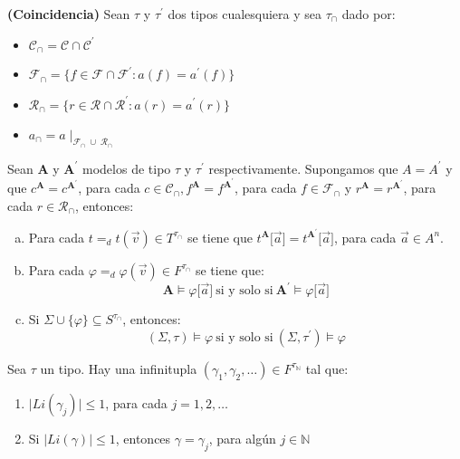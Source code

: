   \begin{lemma} \label{lemma_80}
    \PN \textbf{(Coincidencia)} Sean $\tau$ y $\tau^{\prime}$ dos tipos cualesquiera y sea $\tau_{\cap}$ dado por:
    \begin{itemize}
      \item $\mathcal{C}_{\cap} = \mathcal{C} \cap \mathcal{C}^{\prime}$
      \item $\mathcal{F}_{\cap} = \{f \in \mathcal{F} \cap \mathcal{F}^{\prime}: a(f) = a^{\prime}(f)\}$
      \item $\mathcal{R}_{\cap} = \{r \in \mathcal{R} \cap \mathcal{R}^{\prime}: a(r) = a^{\prime}(r)\}$
      \item $a_{\cap} = a\mid_{\mathcal{F}_{\cap} \; \cup \; \mathcal{R}_{\cap}}$
    \end{itemize}

    \PN Sean $\mathbf{A}$ y $\mathbf{A}^{\prime}$ modelos de tipo $\tau$ y $\tau^{\prime}$ respectivamente. Supongamos
    que $A = A^{\prime}$ y que $c^{\mathbf{A}} = c^{\mathbf{A}^{\prime}}$, para cada $c \in \mathcal{C}_{\cap},
    f^{\mathbf{A}} = f^{\mathbf{A}^{\prime}}$, para cada $f \in \mathcal{F}_{\cap}$ y $r^{\mathbf{A}} =
    r^{\mathbf{A}^{\prime}}$, para cada $r \in \mathcal{R}_{\cap}$, entonces:
    \begin{enumerate}[(a)]
      \item Para cada $t =_{d} t(\vec{v}) \in T^{\tau_{\cap}}$ se tiene que $t^{\mathbf{A}} \lbrack \vec{a} \rbrack =
      t^{\mathbf{A}^{\prime}} \lbrack \vec{a} \rbrack$, para cada $\vec{a} \in A^{n}$.
      \item Para cada $\varphi =_{d} \varphi (\vec{v}) \in F^{\tau_{\cap}}$ se tiene que:
      \[
        \mathbf{A} \models \varphi \lbrack \vec{a} \rbrack \ \text{si y solo si} \ \mathbf{A}^{\prime} \models \varphi
        \lbrack \vec{a} \rbrack
      \]
      \item Si $\Sigma \cup \{\varphi\} \subseteq S^{\tau_{\cap}}$, entonces:
      \[
        (\Sigma, \tau) \models \varphi \ \text{si y solo si} \ (\Sigma, \tau^{\prime}) \models \varphi
      \]
    \end{enumerate}
  \end{lemma}

  \begin{lemma} \label{lemma_81}
    \PN Sea $\tau$ un tipo. Hay una infinitupla $(\gamma_{1}, \gamma_{2}, \dotsc) \in F^{\tau_{\mathbb{N}}}$ tal que:
    \begin{enumerate}
      \item $\lvert Li(\gamma_{j}) \rvert \leq 1$, para cada $j = 1, 2, \dotsc$
      \item Si $\lvert Li(\gamma )\rvert \leq 1$, entonces $\gamma = \gamma_{j}$, para algún $j \in \mathbb{N}$
    \end{enumerate}
  \end{lemma}

